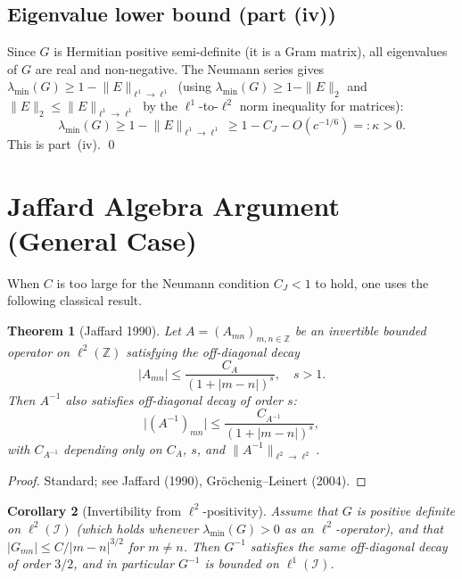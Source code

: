 \documentclass[12pt,a4paper]{amsart}
\newtheorem{theorem}{Theorem}[section]
\newtheorem{corollary}[theorem]{Corollary}
\theoremstyle{definition}
\newcommand{\lmin}{\lambda_{\min}}
\newcommand{\CJ}{C_J}
\newcommand{\normone}[1]{\lVert #1 \rVert_{\ell^1\to\ell^1}}
\newcommand{\abs}[1]{\lvert #1 \rvert}
\begin{document}
\subsection{Eigenvalue lower bound (part (iv))}

Since $G$ is Hermitian positive semi-definite (it is a Gram matrix),
all eigenvalues of $G$ are real and non-negative.
The Neumann series gives $\lmin(G) \ge 1 - \normone{E}$
(using $\lmin(G) \ge 1 - \|E\|_2$ and $\|E\|_2 \le \normone{E}$
by the $\ell^1$-to-$\ell^2$ norm inequality for matrices):
\[
  \lmin(G) \ge 1 - \normone{E} \ge 1 - \CJ - O(c^{-1/6}) =: \kappa > 0.
\]
This is part~(iv). \qed

\section{Jaffard Algebra Argument (General Case)}
\label{sec:jaffard_algebra}

When $C$ is too large for the Neumann condition $\CJ < 1$ to hold,
one uses the following classical result.

\begin{theorem}[Jaffard 1990]
\label{thm:jaffard_algebra}
Let $A = (A_{mn})_{m,n \in \mathbb{Z}}$ be an invertible bounded operator
on $\ell^2(\mathbb{Z})$ satisfying the off-diagonal decay
\[
  \abs{A_{mn}} \le \frac{C_A}{(1+\abs{m-n})^s}, \quad s > 1.
\]
Then $A^{-1}$ also satisfies off-diagonal decay of order $s$:
\[
  \abs{(A^{-1})_{mn}} \le \frac{C_{A^{-1}}}{(1+\abs{m-n})^s},
\]
with $C_{A^{-1}}$ depending only on $C_A$, $s$, and $\|A^{-1}\|_{\ell^2\to\ell^2}$.
\end{theorem}

\begin{proof}
Standard; see Jaffard (1990), Gr\"ochenig--Leinert (2004).
\end{proof}

\begin{corollary}[Invertibility from $\ell^2$-positivity]
\label{cor:jaffard_general}
Assume that $G$ is positive definite on $\ell^2(\mathcal{I})$
(which holds whenever $\lmin(G) > 0$ as an $\ell^2$-operator),
and that $\abs{G_{mn}} \le C/\abs{m-n}^{3/2}$ for $m \ne n$.
Then $G^{-1}$ satisfies the same off-diagonal decay of order $3/2$,
and in particular $G^{-1}$ is bounded on $\ell^1(\mathcal{I})$.
\end{corollary}
\end{document}

